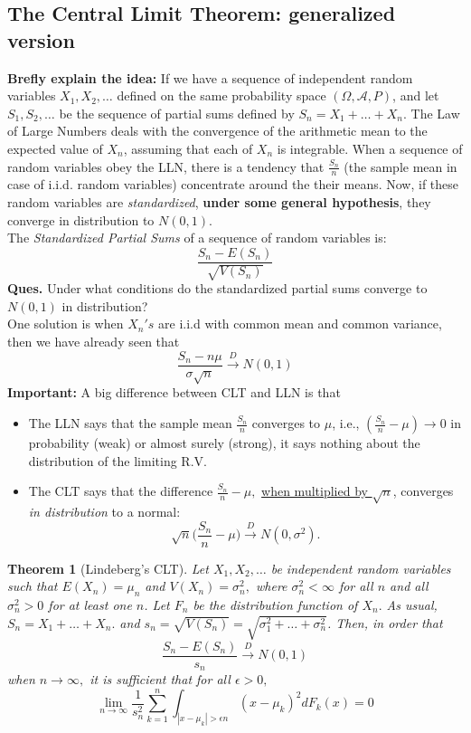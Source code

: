 \documentclass[12pt]{report} \addtolength{\textheight}{2in}
\newtheorem{thm}{Theorem}
\newcommand{\bigA}{\mathcal{A}}
\newcommand{\probsp}{(\Omega, \bigA, P)}
\newcommand{\dto}{\overset{D}{\longrightarrow}}
\begin{document}
 \subsection*{The Central Limit Theorem: generalized version}
 \textbf{Brefly explain the idea:} If we have a sequence of independent random variables $X_1,X_2,\dots$ defined on the same probability space $\probsp$, and let $S_1,S_2,\dots$ be the sequence of partial sums defined by $S_n=X_1+\dots+X_n.$ The Law of Large Numbers deals with the convergence of the arithmetic mean to the expected value of $X_n$, assuming that each of $X_n$ is integrable. When a sequence of random variables obey the LLN, there is a tendency that $\frac{S_n}{n}$ (the sample mean in case of i.i.d. random variables) concentrate around the their means. Now, if these random variables are \textit{standardized}, \textbf{under some general hypothesis}, they converge in distribution to $N(0,1).$\\
 The \textit{Standardized Partial Sums} of a sequence of random variables is:
 \begin{displaymath}
 \frac{S_n-E(S_n)}{\sqrt{V(S_n)}}
 \end{displaymath}
 \textbf{Ques.} Under what conditions do the standardized partial sums converge to $N(0,1)$ in distribution?\\
One solution is when $X_n's$ are i.i.d with common mean and common variance, then we have already seen that 
\begin{displaymath}
\frac{S_n-n\mu}{\sigma \sqrt{n}} \dto N(0,1)
\end{displaymath} 
\textbf{Important:} A big difference between CLT and LLN is that
\begin{itemize}
\item The LLN says that the sample mean $\frac{S_n}{n}$ converges to $\mu$, i.e., $(\frac{S_n}{n}-\mu) \to 0$ in probability (weak) or almost surely (strong), it says nothing about the distribution of the limiting R.V.
\item The CLT says that the difference $\frac{S_n}{n}-\mu,$ \underline{when multiplied by $\sqrt{n}$}, converges \textit{in distribution} to a normal:
\begin{displaymath}
\sqrt{n} \Bigg( \frac{S_n}{n}-\mu \Bigg)  \dto N(0,\sigma^2).
\end{displaymath}
\end{itemize}
\begin{thm}[Lindeberg's CLT] Let $X_1,X_2,\dots$ be independent random variables such that $E(X_n)=\mu_n$ and $V(X_n)=\sigma^2_n,$ where $\sigma^2_n < \infty$ for all $n$ and all $\sigma^2_n > 0$ for at least one $n$. Let $F_n$ be the distribution function of $X_n.$ As usual, $S_n=X_1 + \dots + X_n.$ and $s_n = \sqrt{V(S_n)}=\sqrt{\sigma^2_1+\dots+\sigma^2_n}$. Then, in order that 
\begin{displaymath}
\frac{S_n-E(S_n)}{s_n} \dto N(0,1)
\end{displaymath}
when $n\to \infty,$ it is sufficient that for all $\epsilon > 0,$
\begin{equation}
\lim_{n\to \infty} \frac{1}{s_n^2} \sum_{k=1}^{n}\int_{|x-\mu_k|>\epsilon n} (x-\mu_k)^2 dF_k(x) =0
\end{equation}
\end{thm}
\end{document}
